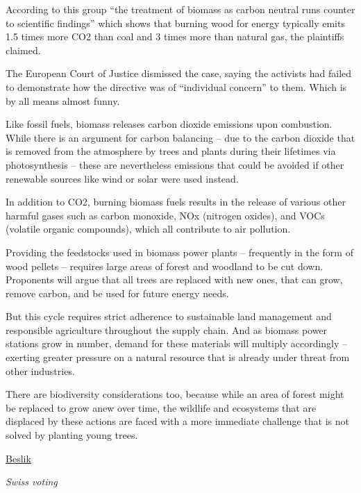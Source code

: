 \documentclass[
]{book}
\begin{document}
According to this group ``the treatment of biomass as carbon neutral runs counter to scientific findings'' which shows that burning wood for energy typically emits 1.5 times more CO2 than coal and 3 times more than natural gas, the plaintiffs claimed.

The European Court of Justice dismissed the case, saying the activists had failed to demonstrate how the directive was of ``individual concern'' to them. Which is by all means almost funny.

Like fossil fuels, biomass releases carbon dioxide emissions upon combustion. While there is an argument for carbon balancing -- due to the carbon dioxide that is removed from the atmosphere by trees and plants during their lifetimes via photosynthesis -- these are nevertheless emissions that could be avoided if other renewable sources like wind or solar were used instead.

In addition to CO2, burning biomass fuels results in the release of various other harmful gases such as carbon monoxide, NOx (nitrogen oxides), and VOCs (volatile organic compounds), which all contribute to air pollution.

Providing the feedstocks used in biomass power plants -- frequently in the form of wood pellets -- requires large areas of forest and woodland to be cut down. Proponents will argue that all trees are replaced with new ones, that can grow, remove carbon, and be used for future energy needs.

But this cycle requires strict adherence to sustainable land management and responsible agriculture throughout the supply chain. And as biomass power stations grow in number, demand for these materials will multiply accordingly -- exerting greater pressure on a natural resource that is already under threat from other industries.

There are biodiversity considerations too, because while an area of forest might be replaced to grow anew over time, the wildlife and ecosystems that are displaced by these actions are faced with a more immediate challenge that is not solved by planting young trees.

\href{https://esgonasunday.substack.com/p/week-18-is-biomass-an-energy-source}{Beslik}

\emph{Swiss voting}
\end{document}
